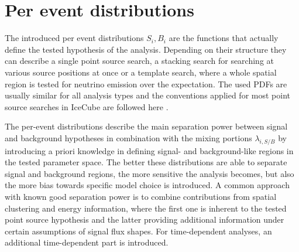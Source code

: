 \section{Per event distributions}
The introduced per event distributions $S_i, B_i$ are the functions that actually define the tested hypothesis of the analysis.
Depending on their structure they can describe a single point source search, a stacking search for searching at various source positions at once or a template search, where a whole spatial region is tested for neutrino emission over the expectation.
The used PDFs are usually similar for all analysis types and the conventions applied for most point source searches in IceCube are followed here \cite{Braun:2010APh,Braun:2008bg}.

The per-event distributions describe the main separation power between signal and background hypotheses in combination with the mixing portions $\lambda_{i,S/B}$ by introducing a priori knowledge in defining signal- and background-like regions in the tested parameter space.
The better these distributions are able to separate signal and background regions, the more sensitive the analysis becomes, but also the more bias towards specific model choice is introduced.
A common approach with known good separation power is to combine contributions from spatial clustering and energy information, where the first one is inherent to the tested point source hypothesis and the latter providing additional information under certain assumptions of signal flux shapes.
For time-dependent analyses, an additional time-dependent part is introduced.

